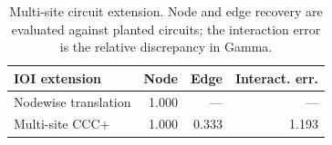 \begin{table}[t]
\centering
\small
\begin{tabular}{lrrr}
\toprule
IOI extension & Node & Edge & Interact. err. \\
\midrule
Nodewise translation & 1.000 & — & — \\
Multi-site CCC+ & 1.000 & 0.333 & 1.193 \\
\bottomrule
\end{tabular}
\caption{Multi-site circuit extension. Node and edge recovery are evaluated against planted circuits; the interaction error is the relative discrepancy in Gamma.}
\label{tab:multisite_extension}
\end{table}